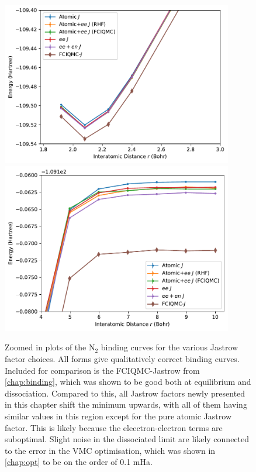 \begin{figure}[htbp]
    \centering
    \includegraphics[width=0.9\textwidth]{figures/universal/n2_avtz_min}
    \includegraphics[width=0.9\textwidth]{figures/universal/n2_avtz_diss}
    \caption{Zoomed in plots of the N$_2$ binding curves for the various Jastrow factor choices. All forms give qualitatively correct binding curves. Included for comparison is the FCIQMC-Jastrow from \autoref{chap:binding}, which was shown to be good both at equilibrium and dissociation. Compared to this, all Jastrow factors newly presented in this chapter shift the minimum upwards, with all of them having similar values in this region except for the pure atomic Jastrow factor. This is likely because the eleectron-electron terms are suboptimal. Slight noise in the dissociated limit are likely connected to the error in the VMC optimisation, which was shown in \autoref{chap:opt} to be on the order of 0.1 mHa.
    }
    \label{eq:binding-universal-zoom}
\end{figure}


